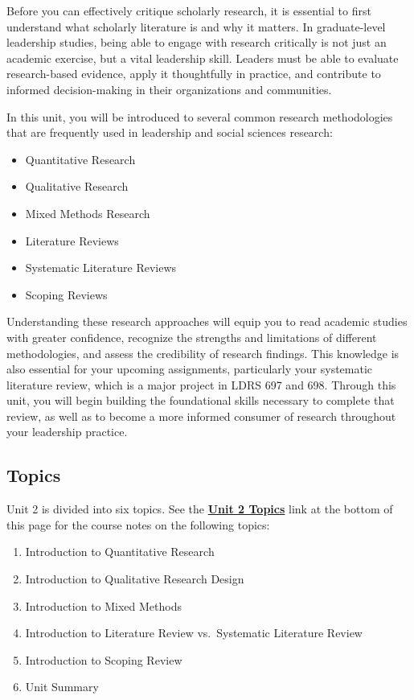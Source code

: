 \documentclass[
  letterpaper,
  DIV=11,
  numbers=noendperiod]{scrreprt}
\providecommand{\tightlist}{%
  \setlength{\itemsep}{0pt}\setlength{\parskip}{0pt}}\usepackage{longtable,booktabs,array}
\begin{document}

Before you can effectively critique scholarly research, it is essential
to first understand what scholarly literature is and why it matters. In
graduate-level leadership studies, being able to engage with research
critically is not just an academic exercise, but a vital leadership
skill. Leaders must be able to evaluate research-based evidence, apply
it thoughtfully in practice, and contribute to informed decision-making
in their organizations and communities.

In this unit, you will be introduced to several common research
methodologies that are frequently used in leadership and social sciences
research:

\begin{itemize}
\tightlist
\item
  Quantitative Research
\item
  Qualitative Research
\item
  Mixed Methods Research
\item
  Literature Reviews
\item
  Systematic Literature Reviews
\item
  Scoping Reviews
\end{itemize}

Understanding these research approaches will equip you to read academic
studies with greater confidence, recognize the strengths and limitations
of different methodologies, and assess the credibility of research
findings. This knowledge is also essential for your upcoming
assignments, particularly your systematic literature review, which is a
major project in LDRS 697 and 698. Through this unit, you will begin
building the foundational skills necessary to complete that review, as
well as to become a more informed consumer of research throughout your
leadership practice.

\subsection*{Topics}\label{topics-1}

Unit 2 is divided into six topics. See the
\href{https://learn.twu.ca/mod/book/view.php?id=1172206}{\textbf{Unit 2
Topics}} link at the bottom of this page for the course notes on the
following topics:

\begin{enumerate}
\def\labelenumi{\arabic{enumi}.}
\tightlist
\item
  Introduction to Quantitative Research
\item
  Introduction to Qualitative Research Design
\item
  Introduction to Mixed Methods
\item
  Introduction to Literature Review vs.~Systematic Literature Review
\item
  Introduction to Scoping Review
\item
  Unit Summary
\end{enumerate}
\end{document}
